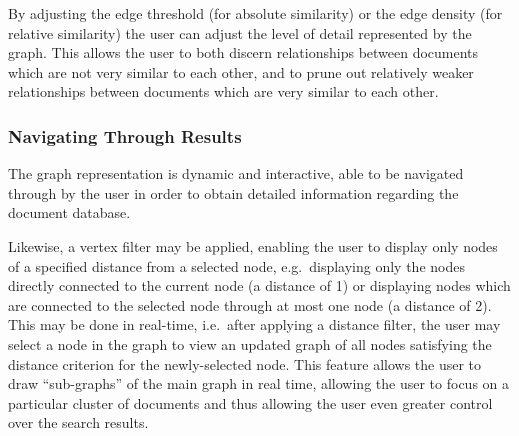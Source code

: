 By adjusting the edge threshold (for absolute similarity) or the edge density (for relative similarity) the user can adjust the level of detail represented by the graph. This allows the user to both discern relationships between documents which are not very similar to each other, and to prune out relatively weaker relationships between documents which are very similar to each other.

\subsubsection {Navigating Through Results}
\label{sec:navigation_through_results}
The graph representation is dynamic and interactive, able to be navigated through by the user in order to obtain detailed information regarding the document database.

Likewise, a vertex filter may be applied, enabling the user to display only nodes of a specified distance from a selected node, e.g.\ displaying only the nodes directly connected to the current node (a distance of 1) or displaying nodes which are connected to the selected node through at most one node (a distance of 2). This may be done in real-time, i.e.\ after applying a distance filter, the user may select a node in the graph to view an updated graph of all nodes satisfying the distance criterion for the newly-selected node. This feature allows the user to draw ``sub-graphs'' of the main graph in real time, allowing the user to focus on a particular cluster of documents and thus allowing the user even greater control over the search results.